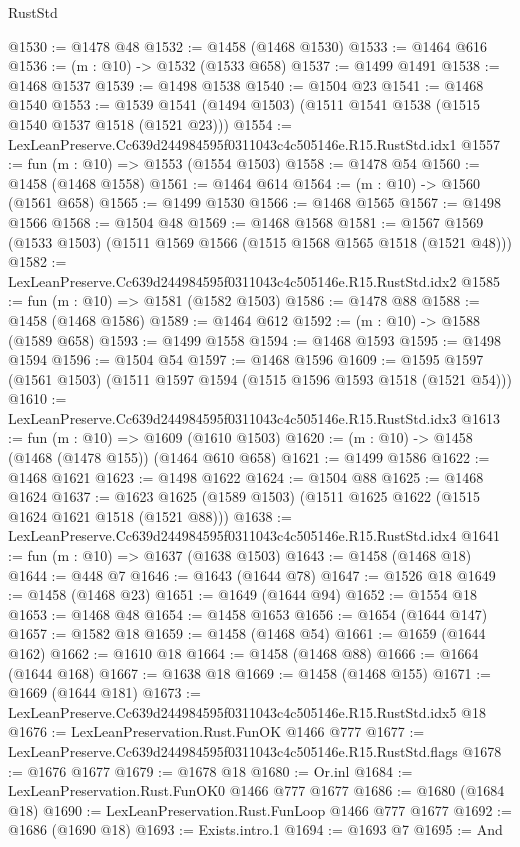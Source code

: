 \begin{lexlean}{RustStd}
\begin{coremodule}
@1530 := @1478 @48
@1532 := @1458 (@1468 @1530)
@1533 := @1464 @616
@1536 := (m : @10) -> @1532 (@1533 @658)
@1537 := @1499 @1491
@1538 := @1468 @1537
@1539 := @1498 @1538
@1540 := @1504 @23
@1541 := @1468 @1540
@1553 := @1539 @1541 (@1494 @1503) (@1511 @1541 @1538 (@1515 @1540 @1537 @1518 (@1521 @23)))
@1554 := LexLeanPreserve.Cc639d244984595f0311043c4c505146e.R15.RustStd.idx1
@1557 := fun (m : @10) => @1553 (@1554 @1503)
@1558 := @1478 @54
@1560 := @1458 (@1468 @1558)
@1561 := @1464 @614
@1564 := (m : @10) -> @1560 (@1561 @658)
@1565 := @1499 @1530
@1566 := @1468 @1565
@1567 := @1498 @1566
@1568 := @1504 @48
@1569 := @1468 @1568
@1581 := @1567 @1569 (@1533 @1503) (@1511 @1569 @1566 (@1515 @1568 @1565 @1518 (@1521 @48)))
@1582 := LexLeanPreserve.Cc639d244984595f0311043c4c505146e.R15.RustStd.idx2
@1585 := fun (m : @10) => @1581 (@1582 @1503)
@1586 := @1478 @88
@1588 := @1458 (@1468 @1586)
@1589 := @1464 @612
@1592 := (m : @10) -> @1588 (@1589 @658)
@1593 := @1499 @1558
@1594 := @1468 @1593
@1595 := @1498 @1594
@1596 := @1504 @54
@1597 := @1468 @1596
@1609 := @1595 @1597 (@1561 @1503) (@1511 @1597 @1594 (@1515 @1596 @1593 @1518 (@1521 @54)))
@1610 := LexLeanPreserve.Cc639d244984595f0311043c4c505146e.R15.RustStd.idx3
@1613 := fun (m : @10) => @1609 (@1610 @1503)
@1620 := (m : @10) -> @1458 (@1468 (@1478 @155)) (@1464 @610 @658)
@1621 := @1499 @1586
@1622 := @1468 @1621
@1623 := @1498 @1622
@1624 := @1504 @88
@1625 := @1468 @1624
@1637 := @1623 @1625 (@1589 @1503) (@1511 @1625 @1622 (@1515 @1624 @1621 @1518 (@1521 @88)))
@1638 := LexLeanPreserve.Cc639d244984595f0311043c4c505146e.R15.RustStd.idx4
@1641 := fun (m : @10) => @1637 (@1638 @1503)
@1643 := @1458 (@1468 @18)
@1644 := @448 @7
@1646 := @1643 (@1644 @78)
@1647 := @1526 @18
@1649 := @1458 (@1468 @23)
@1651 := @1649 (@1644 @94)
@1652 := @1554 @18
@1653 := @1468 @48
@1654 := @1458 @1653
@1656 := @1654 (@1644 @147)
@1657 := @1582 @18
@1659 := @1458 (@1468 @54)
@1661 := @1659 (@1644 @162)
@1662 := @1610 @18
@1664 := @1458 (@1468 @88)
@1666 := @1664 (@1644 @168)
@1667 := @1638 @18
@1669 := @1458 (@1468 @155)
@1671 := @1669 (@1644 @181)
@1673 := LexLeanPreserve.Cc639d244984595f0311043c4c505146e.R15.RustStd.idx5 @18
@1676 := LexLeanPreservation.Rust.FunOK @1466 @777
@1677 := LexLeanPreserve.Cc639d244984595f0311043c4c505146e.R15.RustStd.flags
@1678 := @1676 @1677
@1679 := @1678 @18
@1680 := Or.inl
@1684 := LexLeanPreservation.Rust.FunOK0 @1466 @777 @1677
@1686 := @1680 (@1684 @18)
@1690 := LexLeanPreservation.Rust.FunLoop @1466 @777 @1677
@1692 := @1686 (@1690 @18)
@1693 := Exists.intro.{1}
@1694 := @1693 @7
@1695 := And

\end{coremodule}
\end{lexlean}
